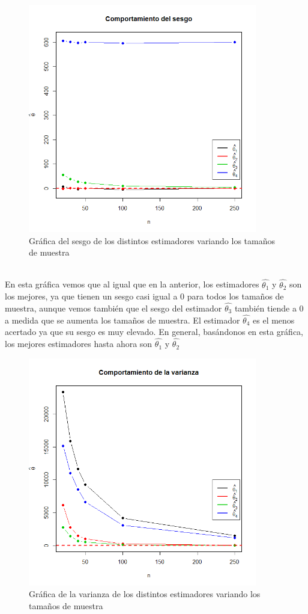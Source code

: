 \documentclass[letterpaper,12pt,onecolumn,titlepage]{article}
\begin{document}
\begin{figure}[!h]
    \begin{center}
        \includegraphics[width=10cm]{Figuras/S.png}
        \caption{Gr\'{a}fica del sesgo de los distintos estimadores variando los tama\~{n}os de muestra}
        \label{fig:Densidad}
    \end{center}
\end{figure}
~\\ En esta gr\'{a}fica vemos que al igual que en la anterior, los estimadores $\hat{\theta_1}$ y $\hat{\theta_2}$ son los mejores, ya que tienen un sesgo casi igual a 0 para todos los tama\~{n}os de muestra, aunque vemos tambi\'{e}n que el sesgo del estimador $\hat{\theta_3}$ tambi\'{e}n tiende a 0 a medida que se aumenta los tama\~{n}os de muestra. El estimador $\hat{\theta_4}$ es el menos acertado ya que su sesgo es muy elevado. En general, bas\'{a}ndonos en esta gr\'{a}fica, los mejores estimadores hasta ahora son $\hat{\theta_1}$ y $\hat{\theta_2}$
\pagebreak \begin{figure}[!h]
    \begin{center}
        \includegraphics[width=10cm]{Figuras/V.png}
        \caption{Gr\'{a}fica de la varianza de los distintos estimadores variando los tama\~{n}os de muestra}
        \label{fig:Densidad}
    \end{center}
\end{figure}
\end{document}
